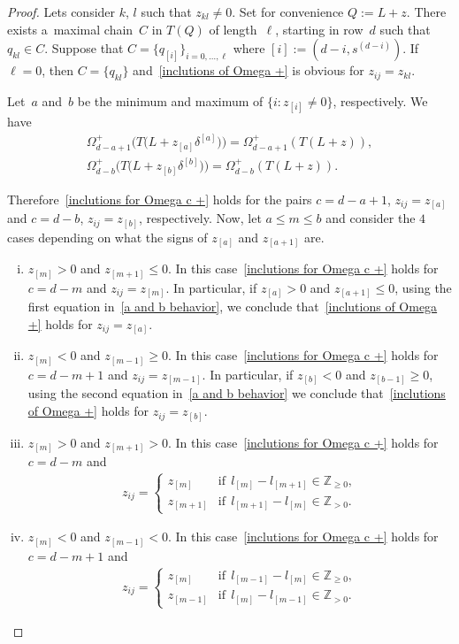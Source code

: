 \documentclass[11pt]{article}
\numberwithin{equation}{section}
\begin{document}
\begin{proof}
Lets consider $k$, $l$ such that $z_{kl}\neq 0$.
Set for convenience $Q:=L+z$.
There exists a~maximal chain~$C$ in $T(Q)$ of length~$\ell$, starting in row~$d$ such that $q_{kl}\in C$.
Suppose that $C=\{q_{[i]}\}_{i=0,\ldots,\ell}$ where $[i]:=(d-i,s^{(d-i)})$.
If $\ell=0$, then $C=\{q_{kl}\}$ and~\eqref{inclutions of Omega +} is obvious for $z_{ij}=z_{kl}$.

Let~$a$ and~$b$ be the minimum and maximum of $\{i:z_{[i]}\neq 0\}$, respectively.
We have
\begin{gather}
\Omega^{+}_{d-a+1}\big(T\big(L+z_{[a]}\delta^{[a]}\big)\big)=\Omega^{+}_{d-a+1}(T(L+z)),\nonumber
\\
\Omega^{+}_{d-b}\big(T\big(L+z_{[b]}\delta^{[b]}\big)\big)=\Omega^{+}_{d-b}(T(L+z)).\label{a and b behavior}
\end{gather}

Therefore~\eqref{inclutions for Omega c +} holds for the pairs $c=d-a+1$, $z_{ij}=z_{[a]}$ and $c=d-b$, $z_{ij}=z_{[b]}$,
respectively.
Now, let $a\leq m\leq b$ and consider the $4$ cases depending on what the signs of $z_{[a]}$ and $z_{[a+1]}$ are.
\begin{enumerate}[(i)]\itemsep=0pt
\item $z_{[m]}>0$ and $z_{[m+1]}\leq 0$.
In this case~\eqref{inclutions for Omega c +} holds for $c=d-m$ and $z_{ij}=z_{[m]}$.
In particular, if $z_{[a]}>0$ and $z_{[a+1]}\leq 0$, using the f\/irst equation in~\eqref{a and b behavior}, we conclude
that~\eqref{inclutions of Omega +} holds for $z_{ij}=z_{[a]}$.
\item $z_{[m]}<0$ and $z_{[m-1]}\geq 0$.
In this case~\eqref{inclutions for Omega c +} holds for $c=d-m+1$ and $z_{ij}=z_{[m-1]}$.
In particular, if $z_{[b]}<0$ and $z_{[b-1]}\geq 0$, using the second equation in~\eqref{a and b behavior} we conclude
that~\eqref{inclutions of Omega +} holds for $z_{ij}=z_{[b]}$.
\item $z_{[m]}>0$ and $z_{[m+1]}> 0$.
In this case~\eqref{inclutions for Omega c +} holds for $c=d-m$ and
\begin{gather*}
z_{ij}=
\begin{cases}
z_{[m]} & \text{if} \ \ l_{[m]}-l_{[m+1]}\in\mathbb{Z}_{\geq 0},
\\
z_{[m+1]} & \text{if} \ \ l_{[m+1]}-l_{[m]}\in\mathbb{Z}_{> 0}.
\end{cases}
\end{gather*}
\item $z_{[m]}<0$ and $z_{[m-1]}< 0$.
In this case~\eqref{inclutions for Omega c +} holds for $c=d-m+1$ and
\begin{gather*}
z_{ij}=
\begin{cases}
z_{[m]} & \text{if} \ \  l_{[m-1]}-l_{[m]}\in\mathbb{Z}_{\geq 0},
\\
z_{[m-1]} & \text{if} \ \ l_{[m]}-l_{[m-1]}\in\mathbb{Z}_{> 0}.
\end{cases}
\end{gather*}
\end{enumerate}


\end{proof}
\end{document}
